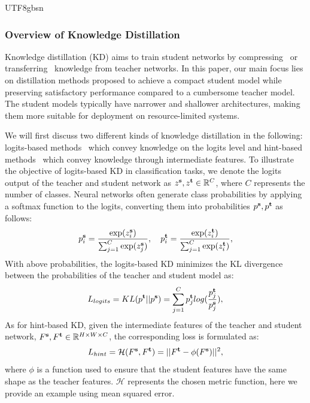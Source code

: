 \documentclass[10pt,journal,compsoc]{IEEEtran}
\newcommand{\<}{\left\langle}
\renewcommand{\>}{\right\rangle}
\newcommand{\1}{\mathbbm{1}}
\begin{document}
\begin{CJK}{UTF8}{gbsn}
\subsubsection{Overview of Knowledge Distillation}

Knowledge distillation (KD) aims to train student networks by compressing~\cite{ba2014deep, bucilua2006model,wu2023weight} or transferring~\cite{hinton2015distilling} knowledge from teacher networks. In this paper, our main focus lies on distillation methods proposed to achieve a compact student model while preserving satisfactory performance compared to a cumbersome teacher model. The student models typically have narrower and shallower architectures, making them more suitable for deployment on resource-limited systems.

We will first discuss two different kinds of knowledge distillation in the following: logits-based methods~\cite{hinton2015distilling,wu2024rethinking,tang2019distilling,ko2024distillm} which convey knowledge on the logits level and hint-based methods~\cite{romero2014fitnets} which convey knowledge through intermediate features. To illustrate the objective of logits-based KD in classification tasks, we denote the logits output of the teacher and student network as $z^{\bf s}, z^{\bf t}\in \mathbb{R}^C$, where $C$ represents the number of classes. Neural networks often generate class probabilities by applying a softmax function to the logits, converting them into probabilities $p^{\bf s}, p^{\bf t}$ as follows:
\begin{equation}
	p_i^{\bf s}=\frac{\exp(z_i^{\bf s})}{\sum_{j=1}^{C}\exp(z_j^{\bf s})},\quad p_i^{\bf t}=\frac{\exp(z_i^{\bf t})}{\sum_{j=1}^{C}\exp(z_i^{\bf t})},
\end{equation}
With above probabilities, the logits-based KD minimizes the KL divergence between the probabilities of the teacher and student model as:
\begin{equation}
	L_{logits}=KL(p^{\bf t}||p^{\bf s})=\sum_{j=1}^{C}p_j^{\bf t}log(\frac{p_j^{\bf t}}{p_j^{\bf s}}),
	\label{eq:KLD}
\end{equation}
As for hint-based KD, given the intermediate features of the teacher and student network, $F^{\bf s}, F^{\bf t}\in \mathbb{R}^{H\times W\times C}$, the corresponding loss is formulated as:
\begin{equation}
	L_{hint}=\mathcal{H}(F^{\bf s}, F^{\bf t})=||F^{\bf t}-\phi(F^{\bf s})||^2,
\end{equation}
where $\phi$ is a function used to ensure that the student features have the same shape as the teacher features. $\mathcal{H}$ represents the chosen metric function, here we provide an example using mean squared error.


\end{CJK}
\end{document}
